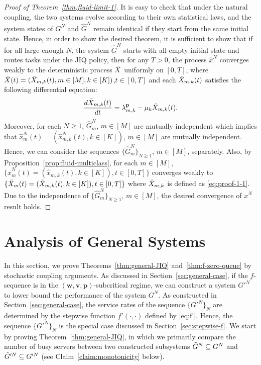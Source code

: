 \documentclass[11pt, reqno]{article}
\numberwithin{equation}{section}
\numberwithin{theorem}{section}
\begin{document}
\begin{proof}[Proof of Theorem~\ref{thm:fluid-limit-1}]
\noindent
It is easy to check that under the natural coupling, the two systems evolve according to their own statistical laws, and the system states of $G^N$ and $\hat{G}^N$ remain identical if they start from the same initial state. 
Hence, in order to show the desired theorem, it is sufficient to show that if for all large enough $N$, the system $\hat{G}^N$ starts with all-empty initial state and routes tasks under the JIQ policy, then for any $T>0$, the process $\hat{x}^N$ converges weakly to the deterministic process $\Bar{X}$ uniformly on $[0,T]$,
where $\Bar{X}(t)=(\Bar{X}_{m,k}(t),m\in[M],k\in[K])$,$t\in[0,T]$ and each $\Bar{X}_{m,k}(t)$ satisfies the following differential equation: 
\begin{equation}\label{eq:proof-1-1}
    \frac{d \Bar{X}_{m,k}(t)}{dt}=\lambda^{\mathbf{p}}_{m,k}-\mu_k \Bar{X}_{m,k}(t).
\end{equation}
Moreover, for each $N\geq 1$, $\hat{G}^N_{m}$, $m\in[M]$ are mutually independent which implies that $\hat{x}^N_m(t)=(\hat{x}^N_{m,k}(t),k\in[K])$, $m\in[M]$ are mutually independent. Hence, we can consider the sequences $\{\hat{G}^N_{m}\}_{N\geq 1}$, $m\in[M]$, separately. Also, by Proposition~\ref{prop:fluid-multiclass},  for each $m\in[M]$, $\{\hat{x}^N_m(t)=(\hat{x}_{m,k}(t),k\in[K]),t\in[0,T]\}$ converges weakly to $\{\Bar{X}_m(t)=(\Bar{X}_{m,k}(t),k\in[K]),t\in[0,T]\}$ where $\Bar{X}_{m,k}$ is defined as \eqref{eq:proof-1-1}. Due to the independence of $\{\hat{G}^N_m\}_{N\geq 1}$, $m\in[M]$, the desired convergence of $x^N$ result holds.
\end{proof}

\section{Analysis of General Systems}\label{sec:proof-general-systems}
In this section, we prove Theorems~\ref{thm:general-JIQ} and~\ref{thm:f-zero-queue} by stochastic coupling arguments.
As discussed in Section~\ref{sec:general-case}, if the $f$-sequence is in the $(\mathbf{w},\mathbf{v},\mathbf{p})$-subcritical regime, we can construct a system $G'^N$ to lower bound the performance of the system $G^N$. 
As constructed in Section~\ref{sec:general-case}, the service rates of the sequence $\{G'^N\}_N$ are determined by the stepwise function $f'(\cdot,\cdot)$ defined by \eqref{eq:f'}. Hence, the sequence $\{G'^N\}_N$ is the special case discussed in Section~\ref{sec:stepwise-f}. 
We start by proving  Theorem~\ref{thm:general-JIQ}, in which we primarily compare the number of busy servers between two constructed subsystems $\Tilde{G}^N\subseteq G^N$ and $\Tilde{G}'^N\subseteq G'^N$ (see Claim~\ref{claim:monotonicity} below). 
\end{document}
